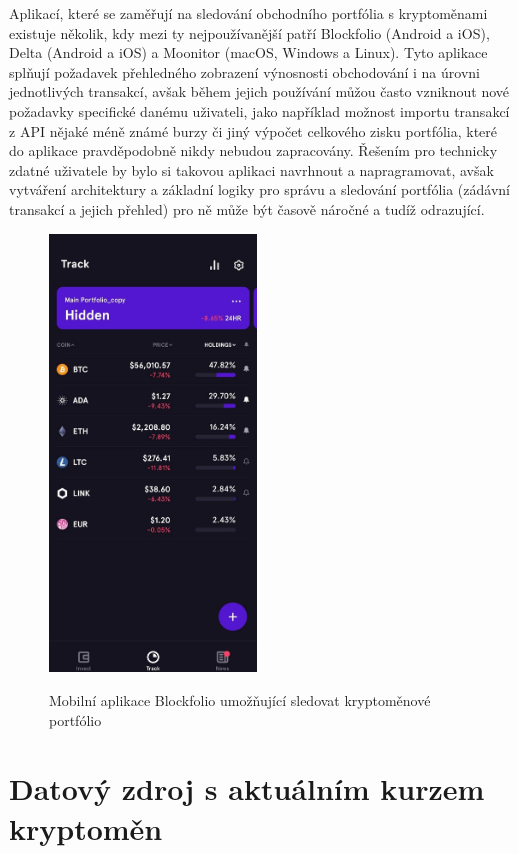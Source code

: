 \documentclass[12pt, a4paper]{article}
\begin{document}
    Aplikací, které se zaměřují na sledování obchodního portfólia s kryptoměnami existuje několik, kdy mezi ty nejpoužívanější patří Blockfolio\cite{blockfolio2021} (Android a iOS), Delta\cite{delta2021} (Android a iOS) a Moonitor\cite{moonitor2021} (macOS, Windows a Linux). Tyto aplikace splňují požadavek přehledného zobrazení výnosnosti obchodování i na úrovni jednotlivých transakcí, avšak během jejich používání můžou často vzniknout nové požadavky specifické danému uživateli, jako například možnost importu transakcí z API nějaké méně známé burzy či jiný výpočet celkového zisku portfólia, které do aplikace pravděpodobně nikdy nebudou zapracovány. Řešením pro technicky zdatné uživatele by bylo si takovou aplikaci navrhnout a napragramovat, avšak vytváření architektury a základní logiky pro správu a sledování portfólia (zádávní transakcí a jejich přehled) pro ně může být časově náročné a tudíž odrazující.

    \begin{figure}[!ht]
        \centering
        {\includegraphics[width=5.5cm]{img/blockfolio.png}}
        \caption{Mobilní aplikace Blockfolio umožňující sledovat kryptoměnové portfólio}
        \label{fig:simple-vrp-czech}
    \end{figure}


    \section{Datový zdroj s aktuálním kurzem kryptoměn}
\end{document}
